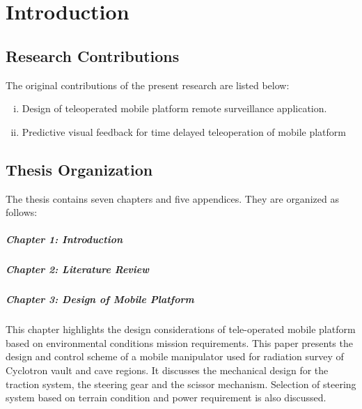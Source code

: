 \chapter{{Introduction}}
\label{ch_1}

\section{Research Contributions}
The original contributions of the present research are listed below:
\begin{enumerate}[(i)]

\item Design of teleoperated mobile platform remote surveillance application.

 

\item Predictive visual feedback for time delayed teleoperation of mobile platform



\end{enumerate}
\section{Thesis Organization}
The thesis contains seven chapters and five appendices. They are organized as follows:
\paragraph*{Chapter 1: Introduction\\}

\paragraph*{Chapter 2: Literature Review\\}


\paragraph*{Chapter 3: Design of Mobile Platform\\}
This chapter highlights the design considerations of tele-operated mobile platform based on environmental conditions mission requirements. This paper presents the design and control scheme of a mobile manipulator used for radiation survey of Cyclotron vault and cave regions. It discusses the mechanical design for the traction system, the steering gear and the scissor mechanism. Selection of  steering system based on terrain condition and power requirement is also discussed.   
